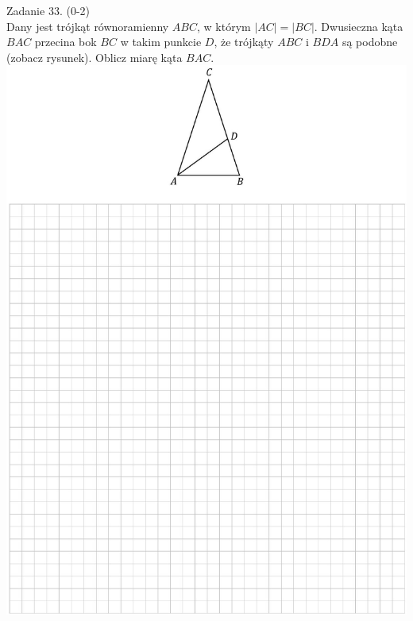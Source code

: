 \documentclass[10pt]{article}
\begin{document}
Zadanie 33. (0-2)\\
Dany jest trójkąt równoramienny \(A B C\), w którym \(|A C|=|B C|\). Dwusieczna kąta \(B A C\) przecina bok \(B C\) w takim punkcie \(D\), że trójkąty \(A B C\) i \(B D A\) są podobne (zobacz rysunek). Oblicz miarę kąta \(B A C\).\\
\includegraphics[max width=\textwidth, center]{2024_11_21_465acd0c12fa3e05e8a7g-20}
\end{document}
